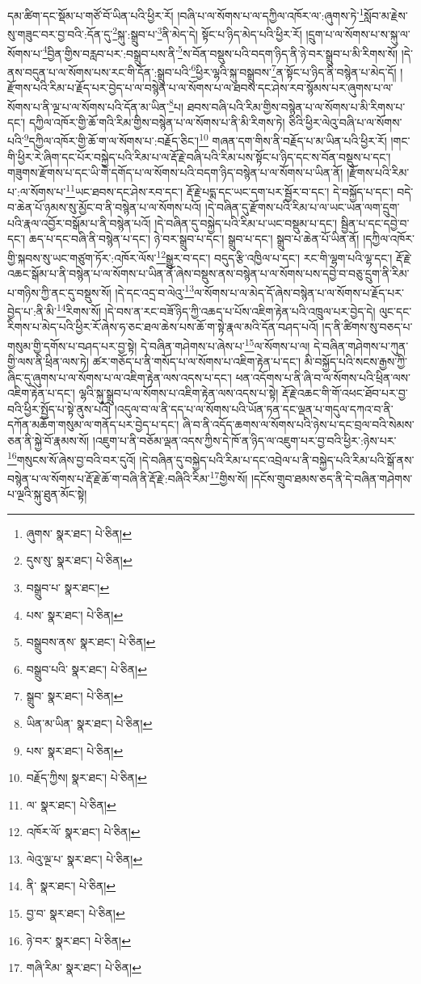 དམ་ཚིག་དང་སྡོམ་པ་གཙོ་བོ་ཡིན་པའི་ཕྱིར་རོ། །བཞི་པ་ལ་སོགས་པ་ལ་དཀྱིལ་འཁོར་ལ་:ཞུགས་ཏེ་\footnote{ཞུགས་  སྣར་ཐང་།  པེ་ཅིན། }སློབ་མ་རྗེས་སུ་གཟུང་བར་བྱ་བའི་:དོན་དུ་\footnote{དུས་སུ་  སྣར་ཐང་།  པེ་ཅིན། }སྐུ་:སྒྲུབ་པ་\footnote{བསྒྲུབ་པ་  སྣར་ཐང་། }ནི་མེད་དེ། སྟོང་པ་ཉིད་མེད་པའི་ཕྱིར་རོ། །དྲུག་པ་ལ་སོགས་པ་ས་སྐུ་ལ་སོགས་པ་\footnote{པས་  སྣར་ཐང་།  པེ་ཅིན། }བྱིན་གྱིས་བརླབ་པར་:བསྒྲུབ་པས་ནི་\footnote{བསྒྲུབས་ནས་  སྣར་ཐང་།  པེ་ཅིན། }ས་བོན་བསྡུས་པའི་བདག་ཉིད་ནི་ཉེ་བར་སྒྲུབ་པ་མི་རིགས་སོ། །དེ་ནས་བདུན་པ་ལ་སོགས་པས་རང་གི་དོན་:སྒྲུབ་པའི་\footnote{བསྒྲུབ་པའི་  སྣར་ཐང་།  པེ་ཅིན། }ཕྱིར་ལྷའི་སྐུ་བསྒྲུབས་\footnote{སྒྲུབ་  སྣར་ཐང་།  པེ་ཅིན། }ན་སྟོང་པ་ཉིད་ནི་བསྙེན་པ་མེད་དོ། །རྫོགས་པའི་རིམ་པ་རྗོད་པར་བྱེད་པ་ལ་བསྙེན་པ་ལ་སོགས་པ་ལ་ཐབས་དང་ཤེས་རབ་སྙོམས་པར་ཞུགས་པ་ལ་སོགས་པ་ནི་ལྔ་པ་ལ་སོགས་པའི་དོན་མ་ཡིན་\footnote{ཡིན་མ་ཡིན་  སྣར་ཐང་།  པེ་ཅིན། }པ། ཐབས་བཞི་པའི་རིམ་གྱིས་བསྙེན་པ་ལ་སོགས་པ་མི་རིགས་པ་དང་། དཀྱིལ་འཁོར་གྱི་ཆོ་གའི་རིམ་གྱིས་བསྙེན་པ་ལ་སོགས་པ་ནི་མི་རིགས་ཏེ། ཅིའི་ཕྱིར་ལེའུ་བཞི་པ་ལ་སོགས་པའི་\footnote{པས་  སྣར་ཐང་།  པེ་ཅིན། }དཀྱིལ་འཁོར་གྱི་ཆོ་ག་ལ་སོགས་པ་:བརྗོད་ཅིང་།\footnote{བརྗོད་ཀྱིས།  སྣར་ཐང་།  པེ་ཅིན། } གཞན་དག་གིས་ནི་བརྗོད་པ་མ་ཡིན་པའི་ཕྱིར་རོ། །གང་གི་ཕྱིར་རེ་ཞིག་དང་པོར་བསྐྱེད་པའི་རིམ་པ་ལ་རྡོ་རྗེ་བཞི་པའི་རིམ་པས་སྟོང་པ་ཉིད་དང་ས་བོན་བསྡུས་པ་དང་། གཟུགས་རྫོགས་པ་དང་ཡི་གེ་དགོད་པ་ལ་སོགས་པའི་བདག་ཉིད་བསྙེན་པ་ལ་སོགས་པ་ཡིན་ནོ། །རྫོགས་པའི་རིམ་པ་:ལ་སོགས་པ་\footnote{ལ་  སྣར་ཐང་།  པེ་ཅིན། }ཡང་ཐབས་དང་ཤེས་རབ་དང་། རྡོ་རྗེ་པདྨ་དང་ཡང་དག་པར་སྦྱོར་བ་དང་། དེ་བསྐྱོད་པ་དང་། བདེ་བ་ཆེན་པོ་ཉམས་སུ་མྱོང་བ་ནི་བསྙེན་པ་ལ་སོགས་པའོ། །དེ་བཞིན་དུ་རྫོགས་པའི་རིམ་པ་ལ་ཡང་ཡན་ལག་དྲུག་པའི་རྣལ་འབྱོར་བསྒོམ་པ་ནི་བསྙེན་པའོ། །དེ་བཞིན་དུ་བསྐྱེད་པའི་རིམ་པ་ཡང་བསྡུམ་པ་དང་། སྦྱིན་པ་དང་དབྱེ་བ་དང་། ཆད་པ་དང་བཞི་ནི་བསྙེན་པ་དང་། ཉེ་བར་སྒྲུབ་པ་དང་། སྒྲུབ་པ་དང་། སྒྲུབ་པ་ཆེན་པོ་ཡིན་ནོ། །དཀྱིལ་འཁོར་གྱི་སྐབས་སུ་ཡང་གཙུག་ཏོར་:འཁོར་ལོས་\footnote{འཁོར་ལོ་  སྣར་ཐང་།  པེ་ཅིན། }སྒྱུར་བ་དང་། བདུད་རྩི་འཁྱིལ་པ་དང་། རང་གི་ལྷག་པའི་ལྷ་དང་། རྡོ་རྗེ་འཆང་སྒོམ་པ་ནི་བསྙེན་པ་ལ་སོགས་པ་ཡིན་ནོ་ཞེས་བསྡུས་ནས་བསྙེན་པ་ལ་སོགས་པས་དབྱེ་བ་བཅུ་དྲུག་ནི་རིམ་པ་གཉིས་ཀྱི་ནང་དུ་བསྡུས་སོ། །དེ་དང་འདྲ་བ་ལེའུ་\footnote{ལེའུ་ལྔ་པ་  སྣར་ཐང་།  པེ་ཅིན། }ལ་སོགས་པ་ལ་མེད་དོ་ཞེས་བསྙེན་པ་ལ་སོགས་པ་རྗོད་པར་བྱེད་པ་:ནི་མི་\footnote{ནི་  སྣར་ཐང་།  པེ་ཅིན། }རིགས་སོ། །དེ་བས་ན་རང་བཟོ་ཉིད་ཀྱི་འཆད་པ་པོས་འཇིག་རྟེན་པའི་འཁྲུལ་པར་བྱེད་དེ། ལུང་དང་རིགས་པ་མེད་པའི་ཕྱིར་རོ་ཞེས་ཧ་ཅང་ཐལ་ཆེས་པས་ཆོ་ག་སྟེ་རྣལ་མའི་དོན་བཤད་པའོ། །ད་ནི་ཚིགས་སུ་བཅད་པ་གསུམ་གྱི་དགོས་པ་བཤད་པར་བྱ་སྟེ། དེ་བཞིན་གཤེགས་པ་ཞེས་པ་\footnote{བྱ་བ་  སྣར་ཐང་།  པེ་ཅིན། }ལ་སོགས་པ་ལ། དེ་བཞིན་གཤེགས་པ་ཀུན་གྱི་ལས་ནི་ཕྲིན་ལས་ཏེ། ཚར་གཅོད་པ་ནི་གསོད་པ་ལ་སོགས་པ་འཇིག་རྟེན་པ་དང་། མི་བསྐྱོད་པའི་སངས་རྒྱས་ཀྱི་ཞིང་དུ་ཞུགས་པ་ལ་སོགས་པ་ལ་འཇིག་རྟེན་ལས་འདས་པ་དང་། ཕན་འདོགས་པ་ནི་ཞི་བ་ལ་སོགས་པའི་ཕྲིན་ལས་འཇིག་རྟེན་པ་དང་། ལྷའི་སྐུ་སྒྲུབ་པ་ལ་སོགས་པ་འཇིག་རྟེན་ལས་འདས་པ་སྟེ། རྡོ་རྗེ་འཆང་གི་གོ་འཕང་ཐོབ་པར་བྱ་བའི་ཕྱིར་སྤྱོད་པ་སྟེ་ནུས་པའོ། །འདུལ་བ་ལ་ནི་དད་པ་ལ་སོགས་པའི་ཡོན་ཏན་དང་ལྡན་པ་གདུལ་དཀའ་བ་ནི་དཀོན་མཆོག་གསུམ་ལ་གནོད་པར་བྱེད་པ་དང་། ཞི་བ་ནི་འདོད་ཆགས་ལ་སོགས་པའི་ཉེས་པ་དང་བྲལ་བའི་སེམས་ཅན་ནི་སྐྱེ་བོ་རྣམས་སོ། །འཇུག་པ་ནི་བཅོམ་ལྡན་འདས་ཀྱིས་དེ་ཁོ་ན་ཉིད་ལ་འཇུག་པར་བྱ་བའི་ཕྱིར་:ཉེས་པར་\footnote{ཉེ་བར་  སྣར་ཐང་།  པེ་ཅིན། }གསུངས་སོ་ཞེས་བྱ་བའི་བར་དུའོ། །དེ་བཞིན་དུ་བསྐྱེད་པའི་རིམ་པ་དང་འབྲེལ་པ་ནི་བསྐྱེད་པའི་རིམ་པའི་སྒོ་ནས་བསྙེན་པ་ལ་སོགས་པ་རྡོ་རྗེ་ཆོ་ག་བཞི་ནི་རྡོ་རྗེ་:བཞིའི་རིམ་\footnote{གཞི་རིམ་  སྣར་ཐང་།  པེ་ཅིན། }གྱིས་སོ། །དངོས་གྲུབ་ཐམས་ཅད་ནི་དེ་བཞིན་གཤེགས་པ་ལྔའི་སྐུ་ཐུན་མོང་སྟེ། 
